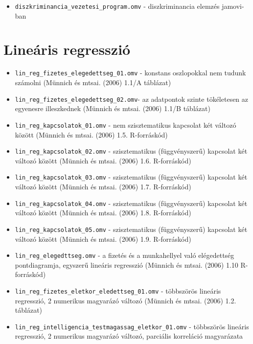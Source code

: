 \documentclass[
  letterpaper,
]{krantz}
\providecommand{\tightlist}{%
  \setlength{\itemsep}{0pt}\setlength{\parskip}{0pt}}\usepackage{longtable,booktabs,array}
\begin{document}
\begin{itemize}
\begin{itemize}
    \begin{itemize}
    \tightlist
    \item
      \texttt{diszkriminancia\_vezetesi\_program.omv} - diszkriminancia
      elemzés jamovi-ban
    \end{itemize}
  \end{itemize}
\end{itemize}

\hypertarget{lineuxe1ris-regressziuxf3}{%
\section{Lineáris regresszió}\label{lineuxe1ris-regressziuxf3}}

\begin{itemize}
\tightlist
\item
  \texttt{lin\_reg\_fizetes\_elegedettseg\_01.omv} - konstans
  oszlopokkal nem tudunk számolni (Münnich és mtsai. (2006) 1.1/A
  táblázat)
\item
  \texttt{lin\_reg\_fizetes\_elegedettseg\_02.omv}- az adatpontok szinte
  tökéletesen az egyenesre illeszkednek (Münnich és mtsai. (2006) 1.1/B
  táblázat)
\item
  \texttt{lin\_reg\_kapcsolatok\_01.omv} - nem szisztematikus kapcsolat
  két változó között (Münnich és mtsai. (2006) 1.5. R-forráskód)
\item
  \texttt{lin\_reg\_kapcsolatok\_02.omv} - szisztematikus
  (függvényszerű) kapcsolat két változó között (Münnich és mtsai. (2006)
  1.6. R-forráskód)
\item
  \texttt{lin\_reg\_kapcsolatok\_03.omv} - szisztematikus
  (függvényszerű) kapcsolat két változó között (Münnich és mtsai. (2006)
  1.7. R-forráskód)
\item
  \texttt{lin\_reg\_kapcsolatok\_04.omv} - szisztematikus
  (függvényszerű) kapcsolat két változó között (Münnich és mtsai. (2006)
  1.8. R-forráskód)
\item
  \texttt{lin\_reg\_kapcsolatok\_05.omv} - szisztematikus
  (függvényszerű) kapcsolat két változó között (Münnich és mtsai. (2006)
  1.9. R-forráskód)
\item
  \texttt{lin\_reg\_elegedttseg.omv} - a fizetés és a munkahellyel való
  elégedettség pontdiagramja, egyszerű lineáris regresszió (Münnich és
  mtsai. (2006) 1.10 R-forráskód)
\item
  \texttt{lin\_reg\_fizetes\_eletkor\_eledettseg\_01.omv} - többszörös
  lineáris regresszió, 2 numerikus magyarázó változó (Münnich és mtsai.
  (2006) 1.2. táblázat)
\item
  \texttt{lin\_reg\_intelligencia\_testmagassag\_eletkor\_01.omv} -
  többszörös lineáris regresszió, 2 numerikus magyarázó változó,
  parciális korreláció magyarázata


\end{itemize}
\end{document}
